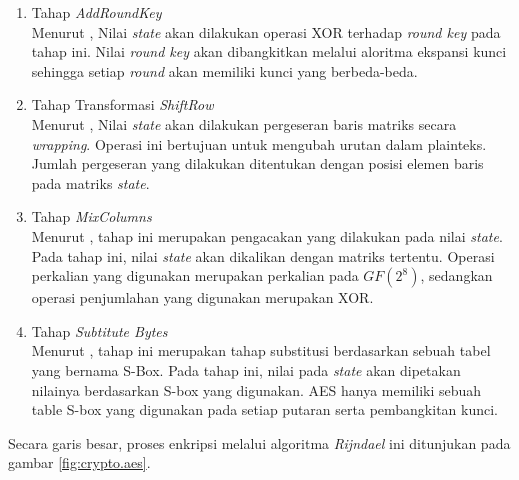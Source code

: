 \begin{enumerate}
  \item Tahap \emph{AddRoundKey}\\Menurut \textcite{munir2019}, Nilai \emph{state} akan dilakukan operasi XOR terhadap \emph{round key} pada tahap ini. Nilai \emph{round key} akan dibangkitkan melalui aloritma ekspansi kunci sehingga setiap \emph{round} akan memiliki kunci yang berbeda-beda.  
  \item Tahap Transformasi \emph{ShiftRow}\\Menurut \textcite{munir2019}, Nilai \emph{state} akan dilakukan pergeseran baris matriks secara \emph{wrapping}. Operasi ini bertujuan untuk mengubah urutan dalam plainteks. Jumlah pergeseran yang dilakukan ditentukan dengan posisi elemen baris pada matriks \emph{state}.
  \item Tahap \emph{MixColumns}\\Menurut \textcite{munir2019}, tahap ini merupakan pengacakan yang dilakukan pada nilai \emph{state}. Pada tahap ini, nilai \emph{state} akan dikalikan dengan matriks tertentu. Operasi perkalian yang digunakan merupakan perkalian pada $GF(2^8)$, sedangkan operasi penjumlahan yang digunakan merupakan XOR.
  \item Tahap \emph{Subtitute Bytes}\\Menurut \textcite{munir2019}, tahap ini merupakan tahap substitusi berdasarkan sebuah tabel yang bernama S-Box. Pada tahap ini, nilai pada \emph{state} akan dipetakan nilainya berdasarkan S-box yang digunakan. AES hanya memiliki sebuah table S-box yang digunakan pada setiap putaran serta pembangkitan kunci.
\end{enumerate}

Secara garis besar, proses enkripsi melalui algoritma \emph{Rijndael} ini ditunjukan pada gambar \ref{fig:crypto.aes}.


